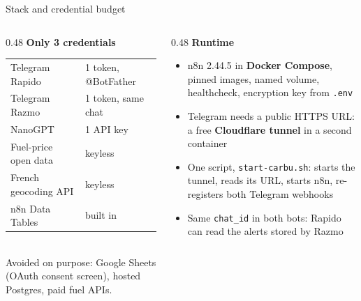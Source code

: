 \documentclass[aspectratio=169,11pt]{beamer}
\begin{document}
\begin{frame}{Stack and credential budget}
  \begin{columns}[T]
    \begin{column}{0.48\textwidth}
      \textbf{Only 3 credentials}\\[4pt]
      \small
      \begin{tabular}{@{}ll@{}}
        \toprule
        Telegram Rapido & 1 token, @BotFather \\
        Telegram Razmo & 1 token, same chat \\
        NanoGPT & 1 API key \\
        \midrule
        Fuel-price open data & {\color{okgreen}keyless} \\
        French geocoding API & {\color{okgreen}keyless} \\
        n8n Data Tables & {\color{okgreen}built in} \\
        \bottomrule
      \end{tabular}\\[6pt]
      \scriptsize\color{soft} Avoided on purpose: Google Sheets (OAuth consent screen), hosted Postgres, paid fuel APIs.
    \end{column}
    \begin{column}{0.48\textwidth}
      \textbf{Runtime}\\[4pt]
      \small
      \begin{itemize}\setlength{\itemsep}{3pt}
        \item n8n 2.44.5 in \textbf{Docker Compose}, pinned images, named volume, healthcheck, encryption key from \texttt{.env}
        \item Telegram needs a public HTTPS URL: a free \textbf{Cloudflare tunnel} in a second container
        \item One script, \texttt{start-carbu.sh}: starts the tunnel, reads its URL, starts n8n, re-registers both Telegram webhooks
        \item Same \texttt{chat\_id} in both bots: Rapido can read the alerts stored by Razmo
      \end{itemize}
    \end{column}
  \end{columns}
\end{frame}
\end{document}
